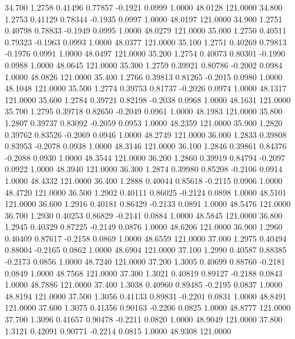   34.700   1.2758   0.41496   0.77857  -0.1921   0.0999   1.0000  48.0128 121.0000
  34.800   1.2753   0.41129   0.78344  -0.1935   0.0997   1.0000  48.0197 121.0000
  34.900   1.2751   0.40798   0.78833  -0.1949   0.0995   1.0000  48.0279 121.0000
  35.000   1.2750   0.40511   0.79323  -0.1963   0.0993   1.0000  48.0377 121.0000
  35.100   1.2751   0.40269   0.79813  -0.1976   0.0991   1.0000  48.0497 121.0000
  35.200   1.2754   0.40073   0.80301  -0.1990   0.0988   1.0000  48.0645 121.0000
  35.300   1.2759   0.39921   0.80786  -0.2002   0.0984   1.0000  48.0826 121.0000
  35.400   1.2766   0.39813   0.81265  -0.2015   0.0980   1.0000  48.1048 121.0000
  35.500   1.2774   0.39753   0.81737  -0.2026   0.0974   1.0000  48.1317 121.0000
  35.600   1.2784   0.39721   0.82198  -0.2038   0.0968   1.0000  48.1631 121.0000
  35.700   1.2795   0.39718   0.82650  -0.2049   0.0961   1.0000  48.1983 121.0000
  35.800   1.2807   0.39737   0.83092  -0.2059   0.0953   1.0000  48.2359 121.0000
  35.900   1.2820   0.39762   0.83526  -0.2069   0.0946   1.0000  48.2749 121.0000
  36.000   1.2833   0.39808   0.83953  -0.2078   0.0938   1.0000  48.3146 121.0000
  36.100   1.2846   0.39861   0.84376  -0.2088   0.0930   1.0000  48.3544 121.0000
  36.200   1.2860   0.39919   0.84794  -0.2097   0.0922   1.0000  48.3940 121.0000
  36.300   1.2874   0.39980   0.85208  -0.2106   0.0914   1.0000  48.4332 121.0000
  36.400   1.2888   0.40044   0.85618  -0.2115   0.0906   1.0000  48.4720 121.0000
  36.500   1.2902   0.40111   0.86025  -0.2124   0.0898   1.0000  48.5101 121.0000
  36.600   1.2916   0.40181   0.86429  -0.2133   0.0891   1.0000  48.5476 121.0000
  36.700   1.2930   0.40253   0.86829  -0.2141   0.0884   1.0000  48.5845 121.0000
  36.800   1.2945   0.40329   0.87225  -0.2149   0.0876   1.0000  48.6206 121.0000
  36.900   1.2960   0.40409   0.87617  -0.2158   0.0869   1.0000  48.6559 121.0000
  37.000   1.2975   0.40494   0.88004  -0.2165   0.0862   1.0000  48.6904 121.0000
  37.100   1.2990   0.40587   0.88385  -0.2173   0.0856   1.0000  48.7240 121.0000
  37.200   1.3005   0.40699   0.88760  -0.2181   0.0849   1.0000  48.7568 121.0000
  37.300   1.3021   0.40819   0.89127  -0.2188   0.0843   1.0000  48.7886 121.0000
  37.400   1.3038   0.40960   0.89485  -0.2195   0.0837   1.0000  48.8194 121.0000
  37.500   1.3056   0.41133   0.89831  -0.2201   0.0831   1.0000  48.8491 121.0000
  37.600   1.3075   0.41356   0.90163  -0.2206   0.0825   1.0000  48.8777 121.0000
  37.700   1.3096   0.41657   0.90478  -0.2211   0.0820   1.0000  48.9049 121.0000
  37.800   1.3121   0.42091   0.90771  -0.2214   0.0815   1.0000  48.9308 121.0000
